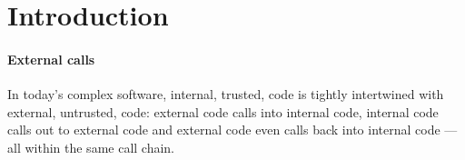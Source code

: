 
\section{Introduction}
\label{s:intro}

\paragraph{External calls}
%
%
In today's complex software, internal, trusted, code  is tightly intertwined  
with external, untrusted, code: external code
calls
into internal code, internal code
calls
out to external code 
and external code
even calls back 
into internal code --- all within the same call chain.

%
%


